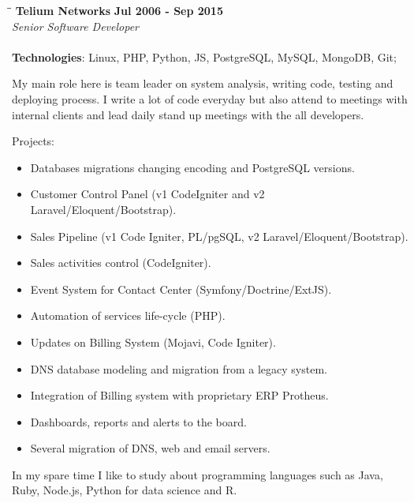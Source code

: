 \documentclass[margin]{res}
\begin{document}
\begin{resume}
\vspace{-0.1in}
   \begin{tabbing}
   \hspace{2.3in}\= \hspace{1.7in}\= \kill %
    \textbf{Telium Networks}    \>\>\textbf{Jul 2006 - Sep 2015}\\
    \textit{Senior Software Developer} \\ \\        
    \textbf{Technologies}: Linux, PHP, Python, JS, PostgreSQL, MySQL, MongoDB, Git;
   \end{tabbing}\vspace{-20pt}      %
    \vspace{2mm}
    My main role here is team leader on system analysis, writing code, testing and deploying process. I write a lot of code everyday but also attend to meetings with internal clients and lead daily stand up meetings with the all developers.

    Projects:
    \begin{itemize}
      \item Databases migrations changing encoding and PostgreSQL versions.
      \item Customer Control Panel (v1 CodeIgniter and v2 Laravel/Eloquent/Bootstrap).
      \item Sales Pipeline (v1 Code Igniter, PL/pgSQL, v2 Laravel/Eloquent/Bootstrap).
      \item Sales activities control (CodeIgniter).
      \item Event System for Contact Center (Symfony/Doctrine/ExtJS).
      \item Automation of services life-cycle (PHP).
      \item Updates on Billing System (Mojavi, Code Igniter).
      \item DNS database modeling and migration from a legacy system.
      \item Integration of Billing system with proprietary ERP Protheus.
      \item Dashboards, reports and alerts to the board.
      \item Several migration of DNS, web and email servers.
    \end{itemize}

In my spare time I like to study about programming languages such as Java, Ruby, Node.js, Python for data science and R.


\end{resume}
\end{document}
